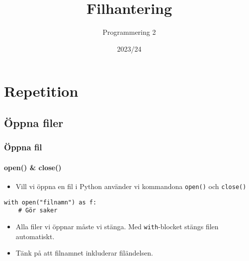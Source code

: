 \documentclass[aspectratio=169]{beamer}
\newcommand{\code}[1]{\colorbox{white}{\lstinline{#1}}}
\begin{document}


\newcommand{\fortt}{\texttt{for}}
\newcommand{\whilett}{\texttt{while}}
\newcommand{\iftt}{\texttt{if}}

\title{Filhantering}
\date{2023/24}
\author{Programmering 2}

\maketitle

\section{Repetition}

	\subsection{Öppna filer}

	\begin{frame}[fragile]
		\frametitle{Öppna fil}
		\framesubtitle{open() \& close()}
		
		\begin{itemize}
			\item Vill vi öppna en fil i Python använder vi kommandona \texttt{open()} och \texttt{close()}
		\end{itemize}
		
		\begin{lstlisting}
with open("filnamn") as f:
	# Gör saker
		\end{lstlisting}
		
		\begin{itemize}
			\item Alla filer vi öppnar måste vi stänga. Med \code{with}-blocket stängs filen automatiskt.
			\item Tänk på att filnamnet inkluderar filändelsen.
		\end{itemize}
		
	\end{frame}
	
\end{document}
